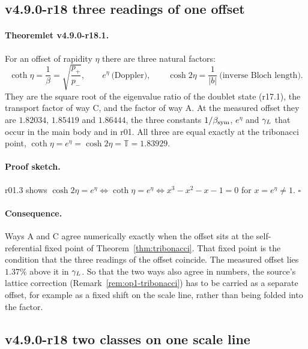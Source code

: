 \subsection*{v4.9.0-r18 three readings of one offset}
\label{subsec:v490-r18-three-readings}

\paragraph{Theoremlet v4.9.0-r18.1.}
For an offset of rapidity \(\eta\) there are three natural factors:
\[
\coth\eta=\frac1\beta=\sqrt{\frac{p_+}{p_-}},\qquad
e^{\eta}\ \text{(Doppler)},\qquad
\cosh2\eta=\frac1{|b|}\ \text{(inverse Bloch length)}.
\]
They are the square root of the eigenvalue ratio of the doublet state (r17.1), the transport factor of way C, and the factor
of way A.  At the measured offset they are \(1.82034\), \(1.85419\) and \(1.86444\), the three constants \(1/\beta_{\mathrm{sym}}\), \(e^\eta\) and
\(\gamma_L\) that occur in the main body and in r01.  All three are equal exactly at the tribonacci point,
\(\coth\eta=e^\eta=\cosh2\eta=\mathbb T=1.83929\).

\paragraph{Proof sketch.}
r01.3 shows \(\cosh2\eta=e^\eta\Leftrightarrow\coth\eta=e^\eta\Leftrightarrow x^3-x^2-x-1=0\) for \(x=e^\eta\neq1\).  \(\square\)

\paragraph{Consequence.}
Ways A and C agree numerically exactly when the offset sits at the self-referential fixed point of
Theorem~\ref{thm:tribonacci}.  That fixed point is the condition that the three readings of the offset coincide.  The measured
offset lies \(1.37\%\) above it in \(\gamma_L\).  So that the two ways also agree in numbers, the source's lattice correction
(Remark~\ref{rem:op1-tribonacci}) has to be carried as a separate offset, for example as a fixed shift on the scale line,
rather than being folded into the factor.

\subsection*{v4.9.0-r18 two classes on one scale line}
\label{subsec:v490-r18-two-classes}

